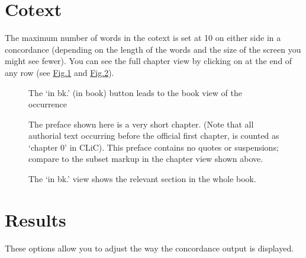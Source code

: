 \documentclass[letterpaper,10pt,english]{sphinxmanual}
\begin{document}
\section{Co\sphinxhyphen{}text}
\label{\detokenize{clicanalysis/concordance:co-text}}
\sphinxAtStartPar
The maximum number of words in the co\sphinxhyphen{}text is set at 10 on either side
in a concordance (depending on the length of the words and the size of
the screen you might see fewer). You can see the full chapter view by
clicking on  at the end of any row (see
\hyperref[\detokenize{clicanalysis/concordance:figure-analysis-concordance-cotext-inbookbutton}]{Fig.\@ \ref{\detokenize{clicanalysis/concordance:figure-analysis-concordance-cotext-inbookbutton}}} and \hyperref[\detokenize{clicanalysis/concordance:figure-analysis-concordance-cotext-inbookchapter}]{Fig.\@ \ref{\detokenize{clicanalysis/concordance:figure-analysis-concordance-cotext-inbookchapter}}}).

\begin{figure}[htbp]
\centering
\capstart

\noindent{}
\caption{The ‘in bk.’ (in book) button leads to the book view
of the occurrence}\label{\detokenize{clicanalysis/concordance:id8}}\label{\detokenize{clicanalysis/concordance:figure-analysis-concordance-cotext-inbookbutton}}\end{figure}

\begin{figure}[htbp]
\centering
\capstart

\noindent{}
\caption{The ‘in bk.’ view shows the relevant section in the whole book.}\label{\detokenize{clicanalysis/concordance:id9}}\label{\detokenize{clicanalysis/concordance:figure-analysis-concordance-cotext-inbookchapter}}
\begin{sphinxlegend}
\sphinxAtStartPar
The preface shown here is a very short chapter. (Note that all authorial
text occurring before the official first chapter, is counted as
‘chapter 0’ in CLiC). This preface contains no quotes or suspensions;
compare to the subset markup in the chapter view shown above.
\end{sphinxlegend}
\end{figure}


\section{Results}
\label{\detokenize{clicanalysis/concordance:results}}
\sphinxAtStartPar
These options allow you to adjust the way the concordance output is
displayed.
\end{document}
